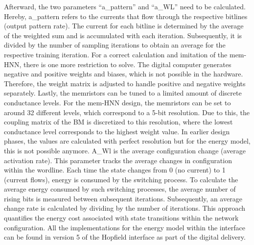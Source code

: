 Afterward, the two parameters ``a\_pattern'' and ``a\_WL'' need to be calculated.
Hereby, a\_pattern refers to the currents that flow through the respective bitlines (output pattern rate).
The current for each bitline is determined by the average of the weighted sum and is accumulated with each iteration.
Subsequently, it is divided by the number of sampling iterations to obtain an average for the respective training iteration.
For a correct calculation and imitation of the \ac{mem-HNN}, there is one more restriction to solve. 
The digital computer generates negative and positive weights and biases, which is not possible in the hardware.
Therefore, the weight matrix is adjusted to handle positive and negative weights separately. 
Lastly, the memristors can be tuned to a limited amount of discrete conductance levels.
For the \ac{mem-HNN} design, the memristors can be set to around 32 different levels, which correspond to a 5-bit resolution. 
Due to this, the coupling matrix of the \ac{BM} is discretized to this resolution, where the lowest conductance level corresponds to the highest weight value.
In earlier design phases, the values are calculated with perfect resolution but for the energy model, this is not possible anymore. 
A\_Wl is the average configuration change (average activation rate).
This parameter tracks the average changes in configuration within the wordline.
Each time the state changes from 0 (no current) to 1 (current flows), energy is consumed by the switching process.
To calculate the average energy consumed by such switching processes, the average number of rising bits is measured between subsequent iterations.
Subsequently, an average change rate is calculated by dividing by the number of iterations.
This approach quantifies the energy cost associated with state transitions within the network configuration.
All the implementations for the energy model within the interface can be found in version 5 of the Hopfield interface as part of the digital delivery.

